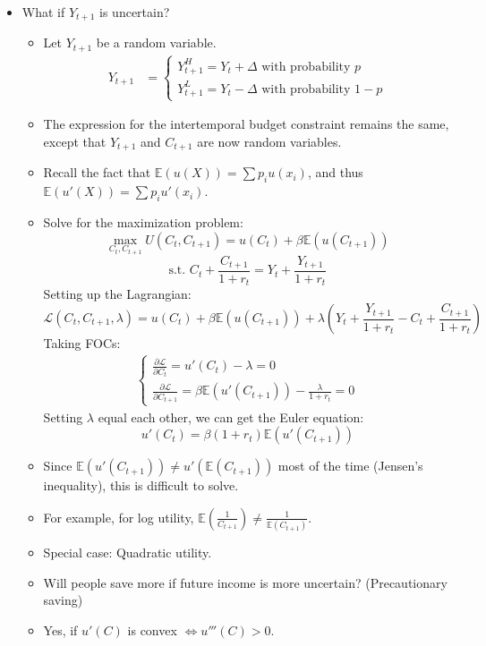 \documentclass[notitlepage]{article}
\begin{document}
\begin{itemize}
\item What if $Y_{t+1}$ is uncertain?
\begin{itemize}
\item Let $Y_{t+1}$ be a random variable.
\begin{align*}
Y_{t+1} &=
\begin{cases}
Y^H_{t+1} = Y_t + \Delta \text{ with probability } p \\
Y^L_{t+1} = Y_t - \Delta \text{ with probability } 1-p
\end{cases}
\end{align*}

\item The expression for the intertemporal budget constraint remains the same, except that $Y_{t+1}$ and $C_{t+1}$ are now random variables.
\item Recall the fact that $\mathbb{E}(u(X))=\sum p_i u(x_i)$, and thus $\mathbb{E}(u'(X))=\sum p_i u'(x_i)$.
\item Solve for the maximization problem:
\[
\max_{C_t, C_{t+1}} U(C_t, C_{t+1}) = u(C_t) + \beta \mathbb{E}(u(C_{t+1}))
\]
\[
\text{s.t. } C_t + \frac{C_{t+1}}{1+r_t} = Y_t + \frac{Y_{t+1}}{1+r_t}
\]
Setting up the Lagrangian:
\[
\mathcal{L}(C_t, C_{t+1}, \lambda) = u(C_t) + \beta \mathbb{E}(u(C_{t+1})) + \lambda (Y_t + \frac{Y_{t+1}}{1+r_t} - C_t + \frac{C_{t+1}}{1+r_t})
\]
Taking FOCs:
\begin{align*}
\begin{cases}
\frac{\partial \mathcal{L}}{\partial C_{t}} = u'(C_t) - \lambda = 0 \\
\frac{\partial \mathcal{L}}{\partial C_{t+1}} = \beta \mathbb{E}(u'(C_{t+1})) - \frac{\lambda}{1+r_t} = 0
\end{cases}
\end{align*}
Setting $\lambda$ equal each other, we can get the Euler equation:
\[
u'(C_t) = \beta(1+r_t)\mathbb{E}(u'(C_{t+1}))
\]
\item Since $\mathbb{E}(u'(C_{t+1})) \ne u'(\mathbb{E}(C_{t+1}))$ most of the time (Jensen's inequality), this is difficult to solve.
\item For example, for log utility, $\mathbb{E}\left(\frac{1}{C_{t+1}}\right) \ne \frac{1}{\mathbb{E}(C_{t+1})}$.
\item Special case: Quadratic utility.
\item Will people save more if future income is more uncertain? (Precautionary saving)
\item Yes, if $u'(C)$ is convex $\iff u'''(C) > 0$.
\end{itemize}
\end{itemize}
\end{document}
